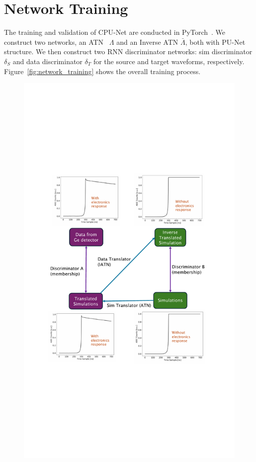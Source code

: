 \section{Network Training}

The training and validation of CPU-Net are conducted in PyTorch~\cite{pytorch}. We construct two networks, an ATN~ $\Lambda$ and an Inverse ATN $\bar{\Lambda}$, both with PU-Net structure. We then construct two RNN discriminator networks: sim discriminator $\delta_{S}$ and data discriminator $\delta_{T}$ for the source and target waveforms, respectively. Figure~\ref{fig:network_training} shows the overall training process.
\clearpage
\begin{figure}[htb!]
    \includegraphics[width=0.99\linewidth,trim={5.5pc 20pc 6.3pc 19pc},clip]{ch7/figs/cycle_gan_training.pdf}

\end{figure}
